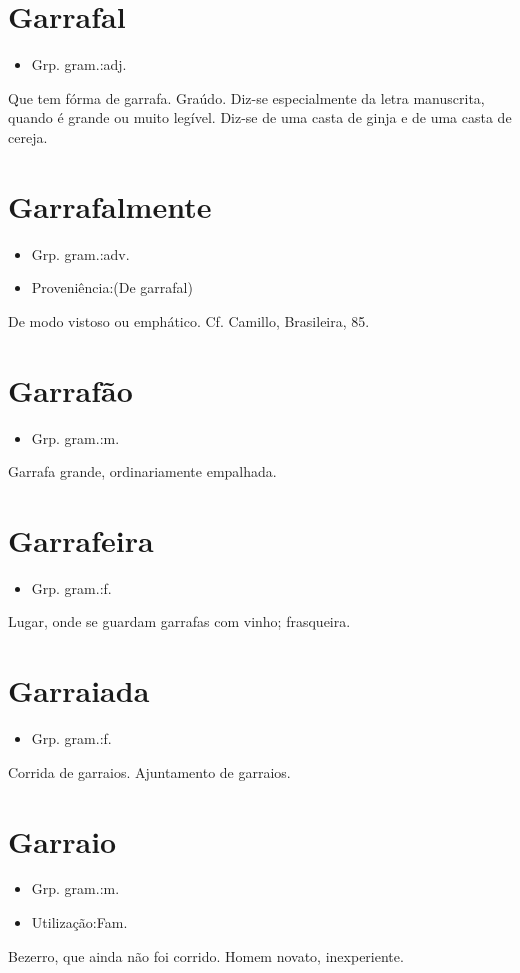 \section{Garrafal}
\begin{itemize}
\item {Grp. gram.:adj.}
\end{itemize}
Que tem fórma de garrafa.
Graúdo.
Diz-se especialmente da letra manuscrita, quando é grande ou muito legível.
Diz-se de uma casta de ginja e de uma casta de cereja.
\section{Garrafalmente}
\begin{itemize}
\item {Grp. gram.:adv.}
\end{itemize}
\begin{itemize}
\item {Proveniência:(De \textunderscore garrafal\textunderscore )}
\end{itemize}
De modo vistoso ou emphático. Cf. Camillo, \textunderscore Brasileira\textunderscore , 85.
\section{Garrafão}
\begin{itemize}
\item {Grp. gram.:m.}
\end{itemize}
Garrafa grande, ordinariamente empalhada.
\section{Garrafeira}
\begin{itemize}
\item {Grp. gram.:f.}
\end{itemize}
Lugar, onde se guardam garrafas com vinho; frasqueira.
\section{Garraiada}
\begin{itemize}
\item {Grp. gram.:f.}
\end{itemize}
Corrida de garraios.
Ajuntamento de garraios.
\section{Garraio}
\begin{itemize}
\item {Grp. gram.:m.}
\end{itemize}
\begin{itemize}
\item {Utilização:Fam.}
\end{itemize}
Bezerro, que ainda não foi corrido.
Homem novato, inexperiente.
